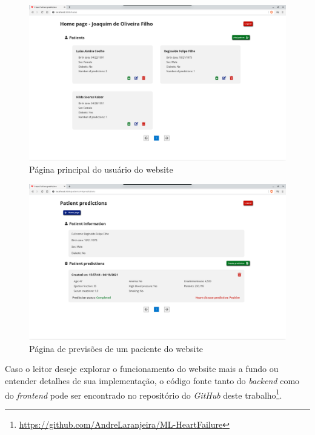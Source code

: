 \begin{figure}[ht!]
  \centering
  \includegraphics[scale=0.26]{images/website_pagina_home.png}
  \caption{Página principal do usuário do website}
  \label{fig:website_home_page}
\end{figure}

\begin{figure}[ht!]
  \centering
  \includegraphics[scale=0.26]{images/website_pagina_previsoes_paciente.png}
  \caption{Página de previsões de um paciente do website}
  \label{fig:website_patient_predictions_page}
\end{figure}

Caso o leitor deseje explorar o funcionamento do website mais a fundo ou entender detalhes de sua implementação, o código fonte tanto do \textit{backend} como do \textit{frontend} pode ser encontrado no repositório do \textit{GitHub} deste trabalho\footnote{\url{https://github.com/AndreLaranjeira/ML-HeartFailure}}.
